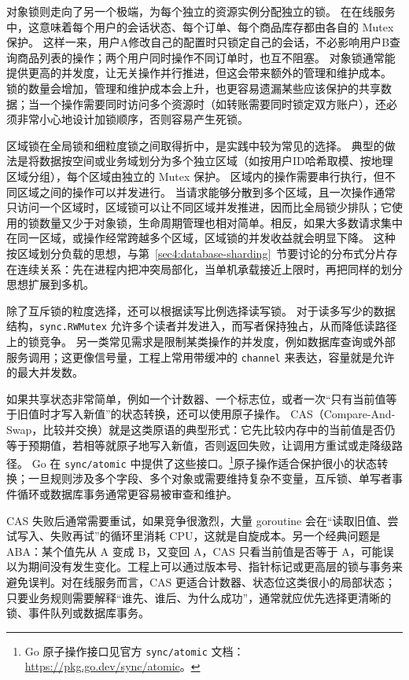 对象锁则走向了另一个极端，为每个独立的资源实例分配独立的锁。
在在线服务中，这意味着每个用户的会话状态、每个订单、每个商品库存都由各自的 Mutex 保护。
这样一来，用户A修改自己的配置时只锁定自己的会话，不必影响用户B查询商品列表的操作；两个用户同时操作不同订单时，也互不阻塞。
对象锁通常能提供更高的并发度，让无关操作并行推进，但这会带来额外的管理和维护成本。
锁的数量会增加，管理和维护成本会上升，也更容易遗漏某些应该保护的共享数据；当一个操作需要同时访问多个资源时（如转账需要同时锁定双方账户），还必须非常小心地设计加锁顺序，否则容易产生死锁。

区域锁在全局锁和细粒度锁之间取得折中，是实践中较为常见的选择。
典型的做法是将数据按空间或业务域划分为多个独立区域（如按用户ID哈希取模、按地理区域分组），每个区域由独立的 Mutex 保护。
区域内的操作需要串行执行，但不同区域之间的操作可以并发进行。
当请求能够分散到多个区域，且一次操作通常只访问一个区域时，区域锁可以让不同区域并发推进，因而比全局锁少排队；它使用的锁数量又少于对象锁，生命周期管理也相对简单。相反，如果大多数请求集中在同一区域，或操作经常跨越多个区域，区域锁的并发收益就会明显下降。
这种按区域划分负载的思想，与第~\ref{sec4:database-sharding}~节要讨论的分布式分片存在连续关系：先在进程内把冲突局部化，当单机承载接近上限时，再把同样的划分思想扩展到多机。

除了互斥锁的粒度选择，还可以根据读写比例选择读写锁。
对于读多写少的数据结构，\texttt{sync.RWMutex} 允许多个读者并发进入，而写者保持独占，从而降低读路径上的锁竞争。
另一类常见需求是限制某类操作的并发度，例如数据库查询或外部服务调用；这更像信号量，工程上常用带缓冲的 \texttt{channel} 来表达，容量就是允许的最大并发数。

如果共享状态非常简单，例如一个计数器、一个标志位，或者一次“只有当前值等于旧值时才写入新值”的状态转换，还可以使用原子操作。
CAS（Compare-And-Swap，比较并交换）就是这类原语的典型形式：它先比较内存中的当前值是否仍等于预期值，若相等就原子地写入新值，否则返回失败，让调用方重试或走降级路径。
Go 在 \texttt{sync/atomic} 中提供了这些接口。\footnote{Go 原子操作接口见官方 \texttt{sync/atomic} 文档：\url{https://pkg.go.dev/sync/atomic}。}原子操作适合保护很小的状态转换；一旦规则涉及多个字段、多个对象或需要维持复杂不变量，互斥锁、单写者事件循环或数据库事务通常更容易被审查和维护。

CAS 失败后通常需要重试，如果竞争很激烈，大量 goroutine 会在“读取旧值、尝试写入、失败再试”的循环里消耗 CPU，这就是自旋成本。另一个经典问题是 ABA：某个值先从 A 变成 B，又变回 A，CAS 只看当前值是否等于 A，可能误以为期间没有发生变化。工程上可以通过版本号、指针标记或更高层的锁与事务来避免误判。对在线服务而言，CAS 更适合计数器、状态位这类很小的局部状态；只要业务规则需要解释“谁先、谁后、为什么成功”，通常就应优先选择更清晰的锁、事件队列或数据库事务。


